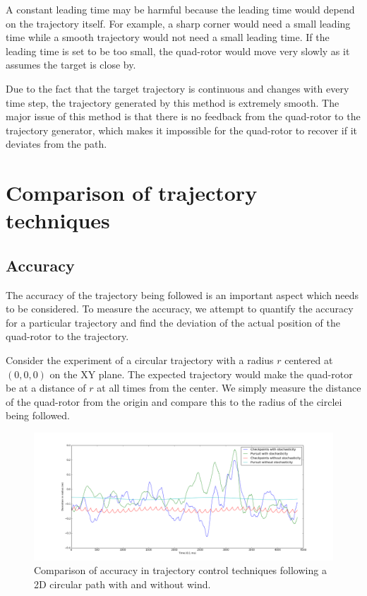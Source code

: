 \documentclass[hidelinks,BTech]{iitmdiss}
\begin{document}
A constant leading time may be harmful because the leading time would depend on the trajectory itself. For example, a sharp corner would need a small leading time while a smooth trajectory would not need a small leading time. If the leading time is set to be too small, the quad-rotor would move very slowly as it assumes the target is close by.

Due to the fact that the target trajectory is continuous and changes with every time step, the trajectory generated by this method is extremely smooth. The major issue of this method is that there is no feedback from the quad-rotor to the trajectory generator, which makes it impossible for the quad-rotor to recover if it deviates from the path.

\section{Comparison of trajectory techniques}

\subsection{Accuracy}
The accuracy of the trajectory being followed is an important aspect which needs to be considered. To measure the accuracy, we attempt to quantify the accuracy for a particular trajectory and find the deviation of the actual position of the quad-rotor to the trajectory.

Consider the experiment of a circular trajectory with a radius $r$ centered at $(0,0,0)$ on the XY plane. The expected trajectory would make the quad-rotor be at a distance of $r$ at all times from the center. We simply measure the distance of the quad-rotor from the origin and compare this to the radius of the circlei being followed.

\begin{figure}[H]
  \centering
    \includegraphics[width=\textwidth]{comparison_accuracy.png}
    \caption{Comparison of accuracy in trajectory control techniques following a 2D circular path with and without wind.}
    \label{fig:TrajectoryComparison}
\end{figure}
\end{document}
